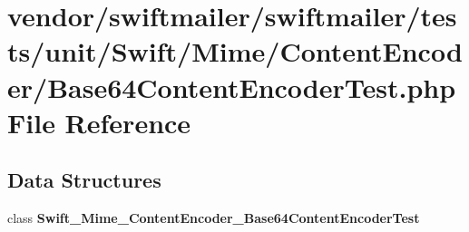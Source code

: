\section{vendor/swiftmailer/swiftmailer/tests/unit/\+Swift/\+Mime/\+Content\+Encoder/\+Base64\+Content\+Encoder\+Test.php File Reference}
\label{_base64_content_encoder_test_8php}
\subsection*{Data Structures}
\begin{DoxyCompactItemize}
\item 
class {\bf Swift\+\_\+\+Mime\+\_\+\+Content\+Encoder\+\_\+\+Base64\+Content\+Encoder\+Test}
\end{DoxyCompactItemize}
